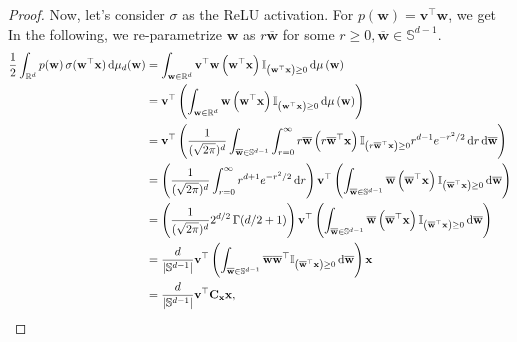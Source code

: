 \begin{proof}
	Now, let's consider $\sigma$ as the ReLU activation.
	For $p(\mathbf{w}) = \mathbf{v}^{\top} \mathbf{w}$, we get
	\fi     
	In the following, we re-parametrize $\mathbf{w}$ as $r \overline{\mathbf{w}}$ for some $r \ge 0, \overline{\mathbf{w}} \in \mathbb{S}^{d-1}$. 
	\begingroup \allowdisplaybreaks
	\begin{align}
		\frac{1}{2}
		\int_{\Reals^d} p(\bw) \,\sigma(\mathbf{w}^{\top} \bx ) \deriv \mu_d (\mathbf{w}) 
		&= \int_{\mathbf{w} \in \mathbb{R}^{d}}  \mathbf{v}^{\top} \mathbf{w}  \left(\mathbf{w}^{\top} \mathbf{x} \right) 
		\mathbb{I}_{\left(\mathbf{w}^{\top} \mathbf{x} \right) \ge 0} \deriv \mu \left(\mathbf{w}\right) \nonumber
		\\&=  \mathbf{v}^{\top} \left(\int_{\mathbf{w} \in \mathbb{R}^{d}} \mathbf{w} \left(\mathbf{w}^{\top} \mathbf{x} \right) \mathbb{I}_{\left(\mathbf{w}^{\top} \mathbf{x} \right) \ge 0} \deriv\mu \left(\mathbf{w}\right) \right) \nonumber
		\\& = \mathbf{v}^{\top} \left( \frac{1}{(\sqrt{2\pi})^{d}} \int_{\overline{\mathbf{w}} \in \mathbb{S}^{d-1}} \int_{r=0}^{\infty}  r \overline{\mathbf{w}} \left(r  \overline{\mathbf{w}}^{\top} \mathbf{x} \right) \mathbb{I}_{\left(r \overline{\mathbf{w}}^{\top} \mathbf{x} \right) \ge 0} r^{d-1}e^{-r^2/2} \deriv r \deriv \overline{\mathbf{w}} \right) \nonumber
		\\& = \left(\frac{1}{(\sqrt{2\pi})^{d}} \int_{r=0}^{\infty} r^{d+1} e^{-r^2/2} \deriv r \right)  \mathbf{v}^{\top} 
		\left(   \int_{\overline{\mathbf{w}} \in \mathbb{S}^{d-1}}  \overline{\mathbf{w}} \left(\overline{\mathbf{w}}^{\top} \mathbf{x} \right)  \mathbb{I}_{\left(\overline{\mathbf{w}}^{\top} \mathbf{x} \right) \ge 0}  \deriv \overline{\mathbf{w}} \right) \nonumber
		\\& = \left(\frac{1}{(\sqrt{2\pi})^{d}} 2^{d/2}\, \Gamma(d/2 +1) \right)  \mathbf{v}^{\top} 
		\left(   \int_{\overline{\mathbf{w}} \in \mathbb{S}^{d-1}}  \overline{\mathbf{w}} \left(\overline{\mathbf{w}}^{\top} \mathbf{x} \right)  \mathbb{I}_{\left(\overline{\mathbf{w}}^{\top} \mathbf{x} \right) \ge 0}  \deriv \overline{\mathbf{w}} \right) \nonumber
		\\&=  \frac{d}{\abs[0]{\Sphere^{d-1}}} \mathbf{v}^{\top} \left(   \int_{\overline{\mathbf{w}} \in \mathbb{S}^{d-1}} \overline{\mathbf{w}} \overline{\mathbf{w}}^{\top} \mathbb{I}_{\left(\overline{\mathbf{w}}^{\top} \mathbf{x} \right) \ge 0}  \deriv \overline{\mathbf{w}} \right) \mathbf{x} \nonumber
		\\& =  \frac{d}{\abs[0]{\Sphere^{d-1}}}  \mathbf{v}^{\top} \mathbf{C}_\bx \mathbf{x},   \label{eqn:pw_computation}

\end{align}
\end{proof}
